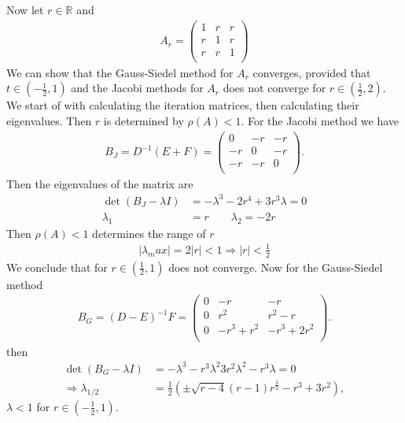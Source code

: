 \subsubsection{}
Now let $r \in \mathbb{R}$ and
\begin{align}
    A_r =
    \begin{pmatrix}
        1 & r & r\\
        r & 1 & r\\
        r & r & 1\\
    \end{pmatrix}
\end{align}
We can show that the Gauss-Siedel method for $A_r$ converges, provided that
$t \in (-\frac{1}{2}, 1)$ and the Jacobi methods for $A_r$ does not converge
for $r \in (\frac{1}{2}, 2)$. We start of with calculating the iteration
matrices, then calculating their eigenvalues. Then $r$ is determined by
$\rho(A) < 1$. For the Jacobi method we have
\begin{align}
    B_J = D^{-1}(E+F) =
    \begin{pmatrix}
        0 & -r & -r\\
        -r & 0 & -r\\
        -r & -r & 0\\
    \end{pmatrix}.
\end{align}
Then the eigenvalues of the matrix are
\begin{align}
    \det(B_J - \lambda I) &= -\lambda^3 - 2r^4 +3r^3\lambda = 0\\
    \lambda_1 &= r \qquad \lambda_2 = -2r
\end{align}
Then $\rho(A) < 1$ determines the range of $r$
\begin{align}
    |\lambda_max| = 2|r| < 1 \Rightarrow |r| < \frac{1}{2}
\end{align}
We conclude that for $r\in (\frac{1}{2} , 1)$ does not converge.
Now for the Gauss-Siedel method
\begin{align}
    B_G = (D-E)^{-1}F =
    \begin{pmatrix}
        0 & -r & -r\\
        0 & r^2 & r^2-r\\
        0 & -r^3+r^2 & -r^3+2r^2\\
    \end{pmatrix}.
\end{align}
then
\begin{align}
    \det\left(B_G - \lambda I \right)  &= -\lambda^3-r^3\lambda^2
    3r^2\lambda^2 - r^3\lambda = 0\\
    \Rightarrow \lambda_{1 / 2}&=
    \frac{1}{2}\left(\pm\sqrt{r-4}(r-1)r^{\frac{3}{2}}-r^{3}+3r^{2}\right),
\end{align}
$\lambda < 1$ for $r \in \left( -\frac{1}{2}, 1\right)$.
